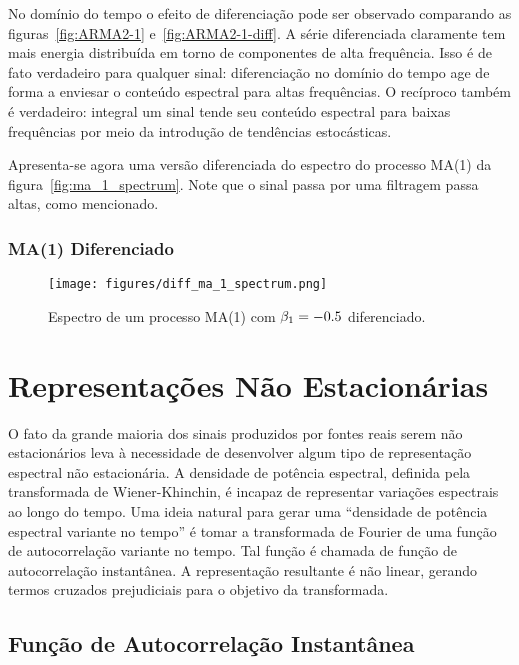 No domínio do tempo o efeito de diferenciação pode ser observado comparando as
figuras~\ref{fig:ARMA2-1} e~\ref{fig:ARMA2-1-diff}. A série diferenciada
claramente tem mais energia distribuída em torno de componentes de alta
frequência. Isso é de fato verdadeiro para qualquer sinal: diferenciação
no domínio do tempo age de forma a enviesar o conteúdo espectral para altas
frequências. O recíproco também é verdadeiro: integral um sinal tende seu
conteúdo espectral para baixas frequências por meio da introdução de tendências
estocásticas.

Apresenta-se agora uma versão diferenciada do espectro do processo MA(1) da
figura~\ref{fig:ma_1_spectrum}. Note que o sinal passa por uma filtragem
passa altas, como mencionado.

\subsubsection{MA(1) Diferenciado}

\begin{figure}[H]
    \centering
    \texttt{[image: figures/diff\_ma\_1\_spectrum.png]}
    \caption{Espectro de um processo MA(1) com $\protect \beta_1 = -0.5$
    diferenciado.}
    \label{fig:diff_ma_1_spectrum}
\end{figure}

\section{Representações Não Estacionárias}

O fato da grande maioria dos sinais produzidos por fontes reais serem não
estacionários leva à necessidade de desenvolver algum tipo de representação
espectral não estacionária. A densidade de potência espectral, definida pela
transformada de Wiener-Khinchin, é incapaz de representar variações espectrais
ao longo do tempo. Uma ideia natural para gerar uma ``densidade de potência
espectral variante no tempo'' é tomar a transformada de Fourier de uma função
de autocorrelação variante no tempo. Tal função é chamada de função de
autocorrelação instantânea. A representação resultante é não linear, gerando
termos cruzados prejudiciais para o objetivo da transformada.

\subsection{Função de Autocorrelação Instantânea}\label{ssec:inst_autocorr}

